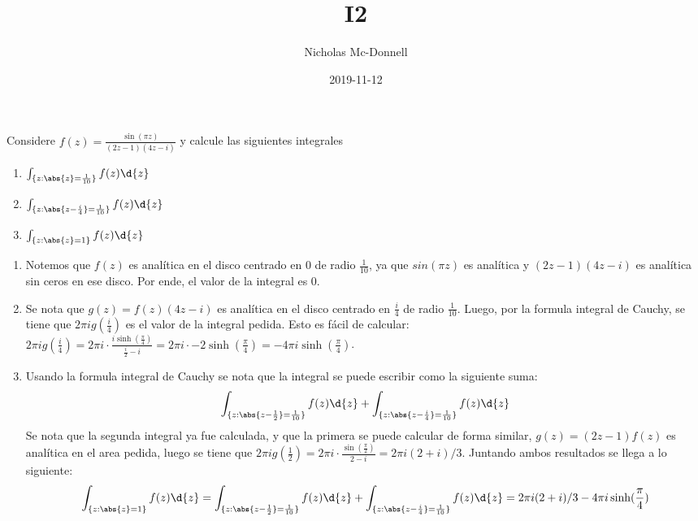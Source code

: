 \documentclass{homework}
\title{I2}
\date{2019-11-12}
\author{Nicholas Mc-Donnell}
\begin{document}
\maketitle
\newpage
{}

\begin{prob}
    Considere \(f(z)=\frac{\sin(\pi z)}{(2z-1)(4z-i)}\) y calcule las siguientes integrales
    \begin{enumerate}
        \item \(\int_{\{z:\abs{z}=\frac1{10}\}}f(z)\d{z}\)
        \item \(\int_{\{z:\abs{z-\frac{i}4}=\frac1{10}\}}f(z)\d{z}\)
        \item \(\int_{\{z:\abs{z}=1\}}f(z)\d{z}\)
    \end{enumerate}
\end{prob}

\begin{sol}
    \begin{enumerate}
        \item Notemos que \(f(z)\) es analítica en el disco centrado en \(0\) de radio \(\frac1{10}\), ya que \(sin(\pi z)\) es analítica y \((2z-1)(4z-i)\) es analítica sin ceros en ese disco. Por ende, el valor de la integral es \(0\).
        \item Se nota que \(g(z)=f(z)(4z-i)\) es analítica en el disco centrado en \(\frac{i}4\) de radio \(\frac1{10}\). Luego, por la formula integral de Cauchy, se tiene que \(2\pi ig(\frac{i}4)\) es el valor de la integral pedida. Esto es fácil de calcular: \(2\pi ig(\frac{i}4)=2\pi i\cdot\frac{i\sinh(\frac\pi4)}{\frac{i}2-i}=2\pi i\cdot-2\sinh(\frac\pi4)=-4\pi i\sinh(\frac\pi4)\).
        \item Usando la formula integral de Cauchy se nota que la integral se puede escribir como la siguiente suma:
              \begin{equation*}
                  \int_{\{z:\abs{z-\frac12}=\frac1{10}\}}f(z)\d{z}+\int_{\{z:\abs{z-\frac{i}4}=\frac1{10}\}}f(z)\d{z}
              \end{equation*}
              Se nota que la segunda integral ya fue calculada, y que la primera se puede calcular de forma similar, \(g(z)=(2z-1)f(z)\) es analítica en el area pedida, luego se tiene que \(2\pi ig(\frac12)=2\pi i\cdot\frac{\sin(\frac\pi2)}{2-i}=2\pi i(2+i)/3\). Juntando ambos resultados se llega a lo siguiente:
              \begin{equation*}
                  \int_{\{z:\abs{z}=1\}}f(z)\d{z}=\int_{\{z:\abs{z-\frac12}=\frac1{10}\}}f(z)\d{z}+\int_{\{z:\abs{z-\frac{i}4}=\frac1{10}\}}f(z)\d{z}=2\pi i(2+i)/3-4\pi i\sinh(\frac\pi4)
              \end{equation*}
    \end{enumerate}
\end{sol}
\end{document}
